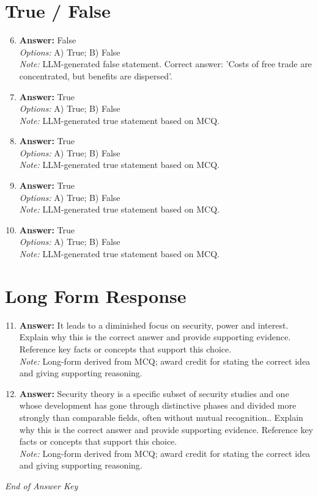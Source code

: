 \documentclass[12pt]{article}
\begin{document}
\section*{True / False}
\begin{enumerate}[label=\arabic*.]
\setcounter{enumi}{5}
\item \textbf{Answer:} False
\\ \textit{Options:} A) True; B) False
\\ \textit{Note:} LLM-generated false statement. Correct answer: 'Costs of free trade are concentrated, but benefits are dispersed'.
\item \textbf{Answer:} True
\\ \textit{Options:} A) True; B) False
\\ \textit{Note:} LLM-generated true statement based on MCQ.
\item \textbf{Answer:} True
\\ \textit{Options:} A) True; B) False
\\ \textit{Note:} LLM-generated true statement based on MCQ.
\item \textbf{Answer:} True
\\ \textit{Options:} A) True; B) False
\\ \textit{Note:} LLM-generated true statement based on MCQ.
\item \textbf{Answer:} True
\\ \textit{Options:} A) True; B) False
\\ \textit{Note:} LLM-generated true statement based on MCQ.
\end{enumerate}

\section*{Long Form Response}
\begin{enumerate}[label=\arabic*.]
\setcounter{enumi}{10}
\item \textbf{Answer:} It leads to a diminished focus on security, power and interest. Explain why this is the correct answer and provide supporting evidence. Reference key facts or concepts that support this choice.
\\ \textit{Note:} Long-form derived from MCQ; award credit for stating the correct idea and giving supporting reasoning.
\item \textbf{Answer:} Security theory is a specific subset of security studies and one whose development has gone through distinctive phases and divided more strongly than comparable fields, often without mutual recognition.. Explain why this is the correct answer and provide supporting evidence. Reference key facts or concepts that support this choice.
\\ \textit{Note:} Long-form derived from MCQ; award credit for stating the correct idea and giving supporting reasoning.
\end{enumerate}

\vfill
\noindent\textit{End of Answer Key}
\end{document}
